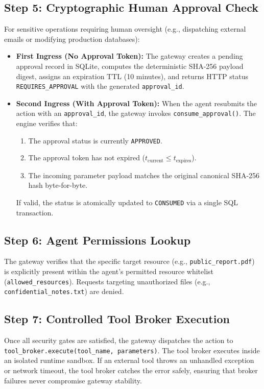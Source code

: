 \subsection{Step 5: Cryptographic Human Approval Check}
For sensitive operations requiring human oversight (e.g., dispatching external emails or modifying production databases):
\begin{itemize}
    \item \textbf{First Ingress (No Approval Token):} The gateway creates a pending approval record in SQLite, computes the deterministic SHA-256 payload digest, assigns an expiration TTL (10 minutes), and returns HTTP status \texttt{REQUIRES\_APPROVAL} with the generated \texttt{approval\_id}.
    \item \textbf{Second Ingress (With Approval Token):} When the agent resubmits the action with an \texttt{approval\_id}, the gateway invokes \texttt{consume\_approval()}. The engine verifies that:
    \begin{enumerate}
        \item The approval status is currently \texttt{APPROVED}.
        \item The approval token has not expired ($t_{\text{current}} \le t_{\text{expires}}$).
        \item The incoming parameter payload matches the original canonical SHA-256 hash byte-for-byte.
    \end{enumerate}
    If valid, the status is atomically updated to \texttt{CONSUMED} via a single SQL transaction.
\end{itemize}

\subsection{Step 6: Agent Permissions Lookup}
The gateway verifies that the specific target resource (e.g., \texttt{public\_report.pdf}) is explicitly present within the agent's permitted resource whitelist (\texttt{allowed\_resources}). Requests targeting unauthorized files (e.g., \texttt{confidential\_notes.txt}) are denied.

\subsection{Step 7: Controlled Tool Broker Execution}
Once all security gates are satisfied, the gateway dispatches the action to \texttt{tool\_broker.execute(tool\_name, parameters)}. The tool broker executes inside an isolated runtime sandbox. If an external tool throws an unhandled exception or network timeout, the tool broker catches the error safely, ensuring that broker failures never compromise gateway stability.

